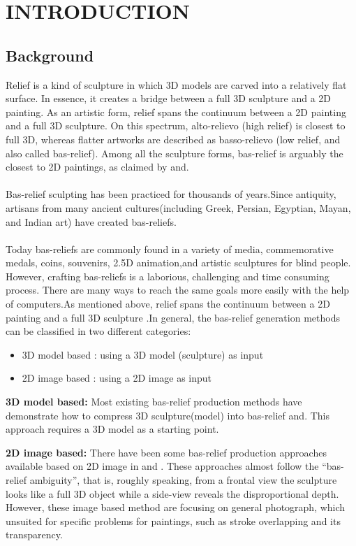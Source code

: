 \chapter{INTRODUCTION}

\section{Background}

Relief is a kind of sculpture in which 3D models are carved into a relatively flat surface. In essence, it creates a bridge between a full 3D sculpture and a 2D painting. As an artistic form, relief spans the continuum between a 2D  painting and a full 3D sculpture\cite{weyrich2007digital}. On this spectrum, alto-relievo (high relief) is closest to full 3D, whereas flatter artworks are described as basso-relievo (low relief, and also called bas-relief). Among all the sculpture forms, bas-relief is arguably the closest to 2D paintings, as claimed by\cite{kerber2009feature} and\cite{barron2012color}.\\ \\
Bas-relief sculpting has been practiced for thousands of years.Since antiquity, artisans from many ancient cultures(including Greek, Persian, Egyptian, Mayan, and Indian art) have created bas-reliefs.\\ \\
Today bas-reliefs are commonly found in a variety of media, commemorative medals, coins, souvenirs, 2.5D animation,and artistic sculptures for blind people. However, crafting bas-reliefs is a laborious, challenging and time consuming process. There are many ways to reach the same goals more easily with the help of computers.As mentioned above, relief spans the continuum between a 2D painting and a full 3D sculpture \cite{weyrich2007digital}.In general, the bas-relief generation methods can be classified in two different categories:
\begin{itemize}
 \item 3D model based : using a 3D model (sculpture) as input 
 \item 2D image based : using a 2D image as input
\end{itemize} 

\textbf{3D model based:} Most existing bas-relief production methods have demonstrate how to compress 3D sculpture(model) into bas-relief \cite{weyrich2007digital}and\cite{kerber2009feature}. This approach requires a 3D model as a starting point. 


\textbf{2D image based:}
There have been some bas-relief production approaches available based on 2D image in\cite{zeng2014region}\cite{wu2013making} and \cite{alexa2010reliefs}. These approaches almost follow the “bas-relief ambiguity”\cite{belhumeur1999bas}, that is, roughly speaking, from a frontal view the sculpture looks like a full 3D object while a side-view reveals the disproportional depth. 
However, these image based method are focusing on general photograph, which unsuited for specific problems for paintings, such as stroke overlapping and its transparency.  

